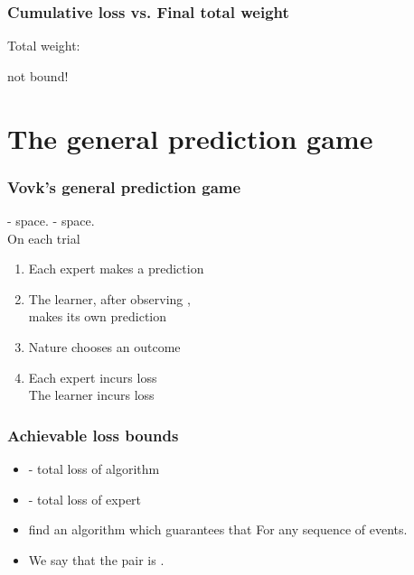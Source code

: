 \documentclass[handout]{beamer}
\begin{document}
\begin{frame}
\frametitle{Cumulative loss vs. Final total weight}

 Total weight: 

 
 
\R{\[
\onslide<8-> -\log W^{T+1} =
\onslide<6-> -\log \frac{W^{T+1}}{W^1} = -\sum_{t=1}^T \log p_A^t(c^t)
\onslide<7-> = L_A^T
\]}
  not bound!
\end{frame}

\section{The general prediction game}

\begin{frame}
\frametitle{Vovk's general prediction game}
\R{$\Gamma$} -  space.
\R{$\Omega$} -  space. \\
\pause
On each trial 
\pause
\begin{enumerate}
\item
Each expert  makes a prediction 
\item
The learner, after observing , \\
makes its own prediction 
\item
Nature chooses an outcome 
\item
Each expert incurs loss  \\
The learner incurs loss 
\end{enumerate}
\end{frame}

\begin{frame}
\frametitle{Achievable loss bounds}
\begin{itemize}
\item {} - total loss of algorithm
\item {} - total loss of expert 
\item {} find an algorithm which guarantees that 
\R{\[
(a,c) \in [0,\infty),\;\; \TAloss \leq a \BEloss + c \ln N 
\]}
For any sequence of events.
\item We say that the pair  is .
\end{itemize}
\end{frame}
\end{document}
